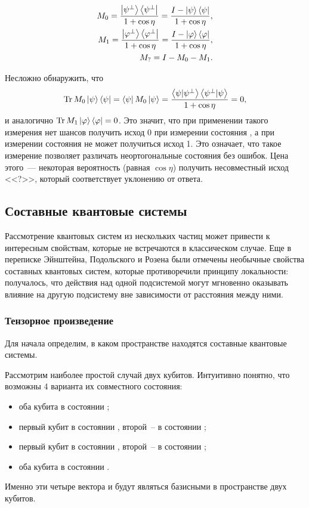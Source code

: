 \begin{eqnarray}\label{unambigious_measurement}
  M_0 = \frac{\left| \psi^\bot \right\rangle\left\langle \psi^\bot \right|}{1 + \cos \eta} = \frac{I - \left| \psi \right\rangle\left\langle \psi \right|}{1 + \cos \eta}, \nonumber\\
  M_1 = \frac{\left| \varphi^\bot \right\rangle\left\langle \varphi^\bot \right|}{1 + \cos \eta} = \frac{I - \left| \varphi \right\rangle\left\langle \varphi \right|}{1 + \cos \eta}, \\
  M_? = I - M_0 - M_1. \nonumber
\end{eqnarray}

Несложно обнаружить, что 
$$ \operatorname{Tr} M_0 \left| \psi \right\rangle\left\langle \psi \right| = \left\langle \psi \right| M_0 \left| \psi \right\rangle = \frac{\left\langle \psi|\psi^\bot\right\rangle \left\langle \psi^\bot|\psi\right\rangle}{1 + \cos \eta} = 0, $$
и аналогично $\operatorname{Tr} M_1 \left| \varphi \right\rangle\left\langle \varphi \right| = 0$. Это значит, что при применении такого измерения нет шансов получить исход 0 при измерении состояния \state{\psi}, а при измерении состояния \state{\varphi} не может получиться исход 1. Это означает, что такое измерение позволяет различать неортогональные состояния без ошибок. Цена этого~--- некоторая вероятность (равная $\cos \eta$) получить несовместный исход <<?>>, который соответствует уклонению от ответа.

\subsection{Составные квантовые системы}
Рассмотрение квантовых систем из нескольких частиц может привести к интересным свойствам, которые не встречаются в классическом случае. Еще в переписке Эйнштейна, Подольского и Розена \cite{epr_paradox} были отмечены необычные свойства составных квантовых систем, которые противоречили принципу локальности: получалось, что действия над одной подсистемой могут мгновенно оказывать влияние на другую подсистему вне зависимости от расстояния между ними. 
\subsubsection{Тензорное произведение}
Для начала определим, в каком пространстве находятся составные квантовые системы.

Рассмотрим наиболее простой случай двух кубитов. Интуитивно понятно, что возможны 4 варианта их совместного состояния:
\begin{itemize}
  \item оба кубита в состоянии ;
  \item первый кубит в состоянии , второй~-- в состоянии ;
  \item первый кубит в состоянии , второй~-- в состоянии ;
  \item оба кубита в состоянии .
\end{itemize}
Именно эти четыре вектора и будут являться базисными в пространстве двух кубитов.

